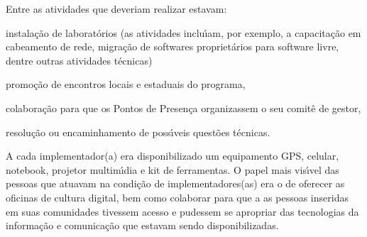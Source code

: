 \documentclass[
12pt,		%
openright,	%
twoside,  %
a4paper,			%
chapter=TITLE,		%
english,			%
french,				%
spanish,			%
brazil				%
]{USPSC-classe/USPSC}
\begin{document}
Entre as atividades que deveriam realizar estavam:









\begin{alineas}
\item instala\c{c}\~ao de laborat\'orios (as atividades inclu\'{\i}am, por exemplo, a capacita\c{c}\~ao em cabeamento de rede, migra\c{c}\~ao de softwares propriet\'arios para software livre, dentre outras atividades t\'ecnicas)
\item promo\c{c}\~ao de encontros locais e estaduais do programa,
\item colabora\c{c}\~ao para que os  Pontos de Presen\c{c}a organizassem o seu comit\^e de gestor,
\item resolu\c{c}\~ao ou encaminhamento de poss\'{\i}veis quest\~oes t\'ecnicas.
\end{alineas}

A cada implementador(a) era disponibilizado um equipamento GPS, celular, notebook, projetor multim\'{\i}dia e kit de ferramentas. O papel mais vis\'{\i}vel das pessoas que atuavam na condi\c{c}\~ao de implementadores(as) era o de oferecer as oficinas de cultura digital, bem como colaborar para que a as pessoas inseridas em suas comunidades tivessem acesso e pudessem se apropriar das tecnologias da informa\c{c}\~ao e comunica\c{c}\~ao que estavam sendo disponibilizadas.









\noindent\begin{center}\mbox{\centering{}}\end{center}
\end{document}
